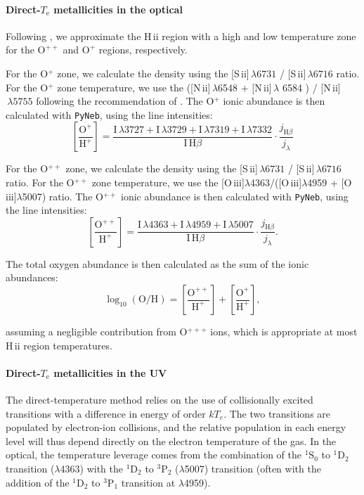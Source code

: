 \documentclass[preprint2]{aastex62}
\newcommand{\hii}{H\,{\sc ii}\xspace}
\newcommand{\nii}{[N\,{\sc ii}]\xspace}
\newcommand{\sii}{[S\,{\sc ii}]\xspace}
\newcommand{\oiii}{[O\,{\sc iii}]\xspace}
\newcommand{\Te}{\ensuremath{T_{\mathrm{e}}}\xspace}
\begin{document}
\paragraph{Direct-\Te metallicities in the optical}
Following \citet{Garnett+1999, Berg+2015}, we approximate the \hii region with a high and low temperature zone for the $\mathrm{O}^{++}$ and $\mathrm{O}^{+}$ regions, respectively. 

For the O$^{+}$ zone, we calculate the density using the \sii$\,\lambda 6731$ / \sii$\,\lambda 6716$ ratio. For the O$^{+}$ zone temperature, we use the (\nii$\,\lambda$6548 $+$ \nii$\,\lambda$ 6584 ) / \nii$\,\lambda 5755$ following the recommendation of \citet{Berg+2015}. The O$^{+}$ ionic abundance is then calculated with {\tt PyNeb}, using the line intensities:
\begin{equation}
    \left[ \frac{\mathrm{O}^{+}}{\mathrm{H}^{+}} \right] = \frac{\mathrm{I}\,\lambda 3727 + \mathrm{I}\,\lambda 3729 + \mathrm{I}\,\lambda 7319 + \mathrm{I}\,\lambda 7332}{\mathrm{I}\,\mathrm{H}\beta} \cdot \frac{j_{\mathrm{H}\beta}}{j_{\lambda}}
\end{equation}

For the O$^{++}$ zone, we calculate the density using the \sii$\,\lambda 6731$ / \sii$\,\lambda 6716$ ratio. For the O$^{++}$ zone temperature, we use the \oiii$\lambda$4363/(\oiii$\lambda$4959 + \oiii$\lambda$5007) ratio. The O$^{++}$ ionic abundance is then calculated with {\tt PyNeb}, using the line intensities:
\begin{equation}
    \left[ \frac{\mathrm{O}^{++}}{\mathrm{H}^{+}} \right] = \frac{\mathrm{I}\,\lambda 4363 + \mathrm{I}\,\lambda 4959 + \mathrm{I}\,\lambda 5007}{\mathrm{I}\,\mathrm{H}\beta} \cdot \frac{j_{\mathrm{H}\beta}}{j_{\lambda}}. 
\end{equation}

The total oxygen abundance is then calculated as the sum of the ionic abundances:
\begin{equation}
    \log_{10}(\mathrm{O}/\mathrm{H}) = \left[ \frac{\mathrm{O}^{++}}{\mathrm{H}^{+}} \right] + \left[ \frac{\mathrm{O}^{+}}{\mathrm{H}^{+}} \right] ,
\end{equation}

assuming a negligible contribution from O$^{+++}$ ions, which is appropriate at most \hii region temperatures.

\paragraph{Direct-\Te metallicities in the UV}
The direct-temperature method relies on the use of collisionally excited transitions with a difference in energy of order $k T_{e}$. The two transitions are populated by electron-ion collisions, and the relative population in each energy level will thus depend directly on the electron temperature of the gas. In the optical, the temperature leverage comes from the combination of the ${}^1 \mathrm{S}_0$ to ${}^1 \mathrm{D}_2$ transition ($\lambda$4363) with the  ${}^1 \mathrm{D}_2$ to ${}^3 \mathrm{P}_2$ ($\lambda$5007) transition (often with the addition of the ${}^1\mathrm{D}_2$ to $^3\mathrm{P}_1$ transition at $\lambda$4959).
\end{document}
